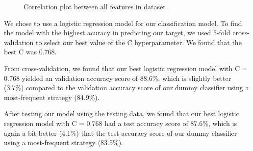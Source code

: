 \documentclass[
  letterpaper,
  DIV=11,
  numbers=noendperiod]{scrartcl}
\begin{document}
\begin{figure}


\caption{\label{fig-correlation_heatmap}Correlation plot between all
features in dataset}

\end{figure}%

We chose to use a logistic regression model for our classification
model. To find the model with the highest acuracy in predicting our
target, we used 5-fold cross-validation to select our best value of the
C hyperparameter. We found that the best C was 0.768.

From cross-validation, we found that our best logistic regression model
with C = 0.768 yielded an validation accuracy score of 88.6\%, which is
slightly better (3.7\%) compared to the validation accuracy score of our
dummy classifier using a most-frequent strategy (84.9\%).

After testing our model using the testing data, we found that our best
logistic regression model with C = 0.768 had a test accuracy score of
87.6\%, which is again a bit better (4.1\%) that the test accuracy score
of our dummy classifier using a most-frequent strategy (83.5\%).
\end{document}
